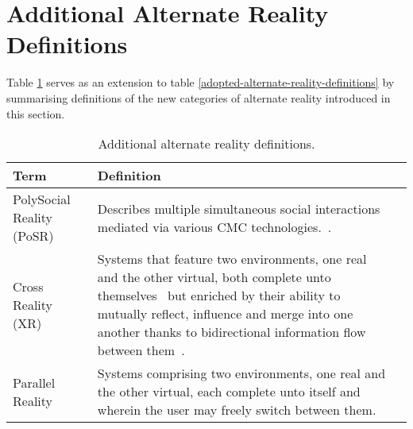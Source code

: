 
\section{Additional Alternate Reality Definitions}
\label{summaryofadditionalalternaterealitydefinitions}

Table \ref{additional-alternate-reality-definitions} serves as an extension to table \ref{adopted-alternate-reality-definitions} by summarising definitions of the new categories of alternate reality introduced in this section.

\begin{table}[h]
\begin{center}
\begin{tabularx}{\textwidth}{l *{2}{>{\centering\arraybackslash}X}}

\toprule

\textbf{Term} & \textbf{Definition} \\

\midrule

		
PolySocial Reality (PoSR) & Describes multiple simultaneous social interactions mediated via various CMC technologies.~\cite{Applin2012}. \\

\midrule


Cross Reality (XR) & Systems that feature two environments, one real and the other virtual, both complete unto themselves~\cite{lifton:merging} but enriched by their ability to mutually reflect, influence and merge into one another thanks to bidirectional information flow between them~\cite{kim:practical}. \\

\midrule


Parallel Reality & Systems comprising two environments, one real and the other virtual, each complete unto itself and wherein the user may freely switch between them. \\


\bottomrule
\end{tabularx}
\end{center}
\caption{Additional alternate reality definitions.}
\label{additional-alternate-reality-definitions}
\end{table}

